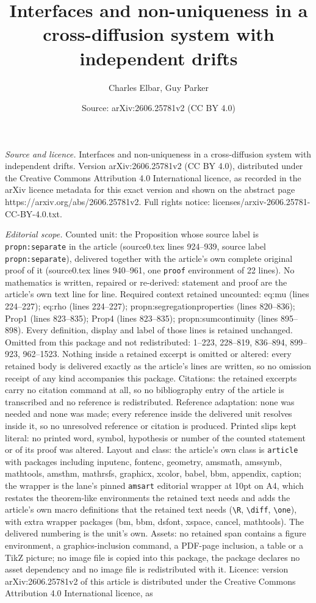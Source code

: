\documentclass[10pt,a4paper]{amsart}
\title[Interfaces and non-uniqueness in a cross-diffusion system wi]{Interfaces and non-uniqueness in a cross-diffusion system with independent drifts}
\author{Charles Elbar, Guy Parker}
\date{Source: arXiv:2606.25781v2 (CC BY 4.0)}
\begin{document}
\maketitle

\noindent\emph{Source and licence.} Interfaces and non-uniqueness in a cross-diffusion system with independent drifts. Version arXiv:2606.25781v2 (CC BY 4.0), distributed under the Creative Commons Attribution 4.0 International licence, as recorded in the arXiv licence metadata for this exact version and shown on the abstract page https://arxiv.org/abs/2606.25781v2. Full rights notice: licenses/arxiv-2606.25781-CC-BY-4.0.txt.\par\smallskip

\noindent\textit{Editorial scope.} Counted unit: the Proposition whose source label is \texttt{propn:separate} in the article (source0.tex lines 924--939, source label \texttt{propn:separate}), delivered together with the article's own complete original proof of it (source0.tex lines 940--961, one \texttt{proof} environment of 22 lines). No mathematics is written, repaired or re-derived: statement and proof are the article's own text line for line. Required context retained uncounted: eq:mu (lines 224--227); eq:rho (lines 224--227); propn:segregationproperties (lines 820--836); Prop1 (lines 823--835); Prop4 (lines 823--835); propn:sumcontinuity (lines 895--898). Every definition, display and label of those lines is retained unchanged. Omitted from this package and not redistributed: 1--223, 228--819, 836--894, 899--923, 962--1523. Nothing inside a retained excerpt is omitted or altered: every retained body is delivered exactly as the article's lines are written, so no omission receipt of any kind accompanies this package. Citations: the retained excerpts carry no citation command at all, so no bibliography entry of the article is transcribed and no reference is redistributed. Reference adaptation: none was needed and none was made; every reference inside the delivered unit resolves inside it, so no unresolved reference or citation is produced. Printed slips kept literal: no printed word, symbol, hypothesis or number of the counted statement or of its proof was altered. Layout and class: the article's own class is \texttt{article} with packages including inputenc, fontenc, geometry, amsmath, amssymb, mathtools, amsthm, mathrsfs, graphicx, xcolor, babel, bbm, appendix, caption; the wrapper is the lane's pinned \texttt{amsart} editorial wrapper at 10pt on A4, which restates the theorem-like environments the retained text needs and adds the article's own macro definitions that the retained text needs (\texttt{\textbackslash R}, \texttt{\textbackslash diff}, \texttt{\textbackslash one}), with extra wrapper packages (bm, bbm, dsfont, xspace, cancel, mathtools). The delivered numbering is the unit's own. Assets: no retained span contains a figure environment, a graphics-inclusion command, a PDF-page inclusion, a table or a TikZ picture; no image file is copied into this package, the package declares no asset dependency and no image file is redistributed with it. Licence: version arXiv:2606.25781v2 of this article is distributed under the Creative Commons Attribution 4.0 International licence, as 
\end{document}
